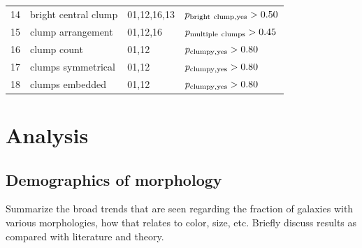 \documentclass[twocolumn]{aastex6}
\begin{document}
\begin{table}
\begin{tabular}{llll}
14       & bright central clump & 01,12,16,13      & $p_{\rm bright~clump,yes}>0.50$    \\
15       & clump arrangement    & 01,12,16         & $p_{\rm multiple~clumps}>0.45$     \\
16       & clump count          & 01,12            & $p_{\rm clumpy,yes}>0.80$          \\
17       & clumps symmetrical   & 01,12            & $p_{\rm clumpy,yes}>0.80$          \\
18       & clumps embedded      & 01,12            & $p_{\rm clumpy,yes}>0.80$          \\
\hline\hline
\end{tabular}
\end{table}

\section{Analysis}\label{sec:analysis}


\subsection{Demographics of morphology}

{\note Summarize the broad trends that are seen regarding the fraction of galaxies with various morphologies, how that relates to color, size, etc. Briefly discuss results as compared with literature and theory.}
\end{document}
